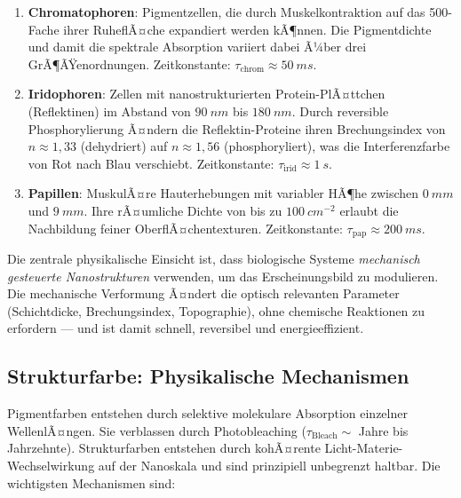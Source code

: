 ﻿\documentclass[a4paper,12pt]{article}
\theoremstyle{definition}
\begin{document}
	\begin{enumerate}[leftmargin=*, label=\textbf{\arabic*.}]
		\item \textbf{Chromatophoren}: Pigmentzellen, die durch Muskelkontraktion auf
		das 500-Fache ihrer Ruhe\-flÃ¤che expandiert werden kÃ¶nnen. Die Pigmentdichte
		und damit die spektrale Absorption variiert dabei Ã¼ber drei GrÃ¶ÃŸenordnungen.
		Zeitkonstante: $\tau_\mathrm{chrom} \approx \SI{50}{ms}$.
		
		\item \textbf{Iridophoren}: Zellen mit nanostrukturierten Protein-PlÃ¤ttchen
		(Reflektinen) im Abstand von $\SI{90}{nm}$ bis $\SI{180}{nm}$. Durch
		reversible Phosphorylierung Ã¤ndern die Reflektin-Proteine ihren Brechungsindex
		von $n \approx 1{,}33$ (dehydriert) auf $n \approx 1{,}56$ (phosphoryliert),
		was die Interferenzfarbe von Rot nach Blau verschiebt.
		Zeitkonstante: $\tau_\mathrm{irid} \approx \SI{1}{s}$.
		
		\item \textbf{Papillen}: MuskulÃ¤re Hauterhebungen mit variabler HÃ¶he zwischen
		$\SI{0}{mm}$ und $\SI{9}{mm}$. Ihre rÃ¤umliche Dichte von bis zu
		$\SI{100}{cm^{-2}}$ erlaubt die Nachbildung feiner OberflÃ¤chentexturen.
		Zeitkonstante: $\tau_\mathrm{pap} \approx \SI{200}{ms}$.
	\end{enumerate}
	
	Die zentrale physikalische Einsicht ist, dass biologische Systeme
	\emph{mechanisch gesteuerte Nanostrukturen} verwenden, um das Erscheinungsbild
	zu modulieren. Die mechanische Verformung Ã¤ndert die optisch relevanten
	Parameter (Schichtdicke, Brechungsindex, Topographie), ohne chemische
	Reaktionen zu erfordern --- und ist damit schnell, reversibel und energieeffizient.
	
	\subsection{Strukturfarbe: Physikalische Mechanismen}
	\label{ssec:strukturfarbe}
	
	Pigmentfarben entstehen durch selektive molekulare Absorption einzelner
	WellenlÃ¤ngen. Sie verblassen durch Photobleaching ($\tau_\mathrm{Bleach} \sim$
	Jahre bis Jahrzehnte). Strukturfarben entstehen durch kohÃ¤rente
	Licht-Materie-Wechselwirkung auf der Nanoskala und sind
	prinzipiell unbegrenzt haltbar. Die wichtigsten Mechanismen sind:
	
\end{document}
